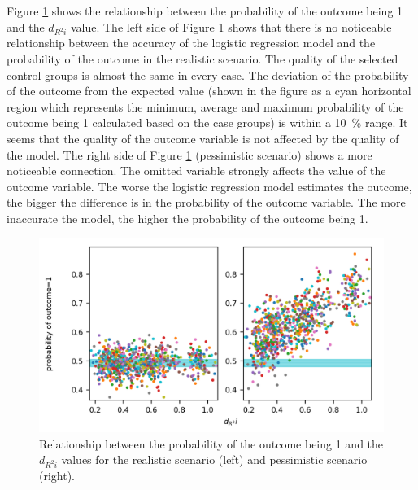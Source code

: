 		Figure \ref{fig:missing_relation} shows the relationship between the probability of the outcome being 1 and the $d_{R^{2}i}$ value. The left side of Figure \ref{fig:missing_relation} shows that there is no noticeable relationship between the accuracy of the logistic regression model and the probability of the outcome in the realistic scenario. The quality of the selected control groups is almost the same in every case. The deviation of the probability of the outcome from the expected value (shown in the figure as a cyan horizontal region which represents the minimum, average and maximum probability of the outcome being 1 calculated based on the case groups) is within a \SI{10}{\percent} range. It seems that the quality of the outcome variable is not affected by the quality of the model. The right side of Figure \ref{fig:missing_relation} (pessimistic scenario) shows a more noticeable connection. The omitted variable strongly affects the value of the outcome variable. The worse the logistic regression model estimates the outcome, the bigger the difference is in the probability of the outcome variable. The more inaccurate the model, the higher the probability of the outcome being 1.
										
		\begin{figure}[h!]
			\centering
			\captionsetup{justification=centering}
			\includegraphics[width=\textwidth]{assets/figures/control_group_selection/missing/relation.png}
			\caption{Relationship between the probability of the outcome being 1 and the $d_{R^{2}i}$ values for the realistic scenario (left) and pessimistic scenario (right). %
			}
			\label{fig:missing_relation}
		\end{figure}
										
